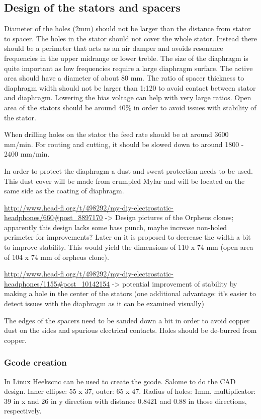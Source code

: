 \documentclass{article}
\begin{document}
\subsection{Design of the stators and spacers}
\label{s:driver:design}
Diameter of the holes (2mm) should not be larger than the distance from stator to spacer. The holes in the stator should not cover the whole stator. Instead there should be a perimeter that acts as an air damper and avoids resonance frequencies in the upper midrange or lower treble. The size of the diaphragm is quite important as low frequencies require a large diaphragm surface. The active area should have a diameter of about 80 mm. The ratio of spacer thickness to diaphragm width should not be larger than 1:120 to avoid contact between stator and diaphragm. Lowering the bias voltage can help with very large ratios. Open area of the stators should be around 40\% in order to avoid issues with stability of the stator.

When drilling holes on the stator the feed rate should be at around 3600 mm/min.  For routing and cutting, it should be slowed down to around 1800 - 2400 mm/min.

In order to protect the diaphragm a dust and sweat protection needs to be used. This dust cover will be made from crumpled Mylar and will be located on the same side as the coating of diaphragm.

\url{http://www.head-fi.org/t/498292/my-diy-electrostatic-headphones/660#post_8897170} -> Design pictures of the Orpheus clones; apparently this design lacks some bass punch, maybe increase non-holed perimeter for improvements? Later on it is proposed to decrease the width a bit to improve stability. This would yield the dimensions of 110 x 74 mm (open area of 104 x 74 mm of orpheus clone).

\url{http://www.head-fi.org/t/498292/my-diy-electrostatic-headphones/1155#post_10142154} -> potential improvement of stability by making a hole in the center of the stators (one additional advantage: it's easier to detect issues with the diaphragm as it can be examined visually)

The edges of the spacers need to be sanded down a bit in order to avoid copper dust on the sides and spurious electrical contacts. Holes should be de-burred from copper.

\subsubsection{Gcode creation}
\label{s:driver:design:gcode}
In Linux Heekscnc can be used to create the gcode. Salome to do the CAD design. Inner ellipse: 55 x 37, outer: 65 x 47. Radius of holes: 1mm, multiplicator: 39 in x and 26 in y direction with distance 0.8421 and 0.88 in those directions, respectively.
\end{document}
